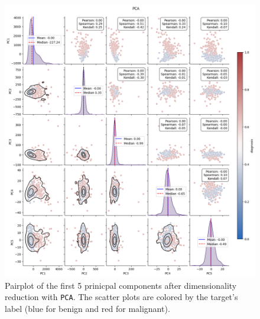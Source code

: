\documentclass[12pt]{article}
\begin{document}
\begin{figure}[H]
    \centering
    \includegraphics[width=\textwidth]{ims/pca.png}
    \caption{Pairplot of the first 5 prinicpal components after dimensionality
    reduction with \texttt{PCA}. The scatter plots are colored by the target's
    label (blue for benign and red for malignant).}
    \label{fig:pca}
\end{figure}
\end{document}
